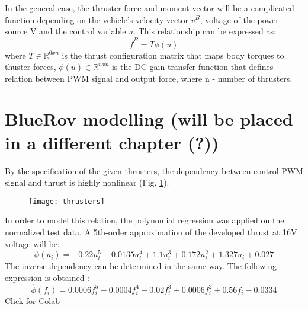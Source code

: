     In the general case, the thruster force and moment vector will be 
    a complicated function depending on the vehicle's velocity vector $\bar{v}^B$, 
    voltage of the power source V 
    and the control variable $u$.
    This relationship can be expressed as:
    $$
    \bar{f}^B=T\phi(u)
    $$
    where $T \in \mathbb{R}^{6 x n}$ is the thrust configuration matrix that maps body torques to thuster forces, 
    $\phi(u) \in \mathbb{R}^{n x n}$ is the DC-gain transfer function that defines relation between
    PWM signal and output force, where n - number of thrusters.

\section{BlueRov modelling (will be placed in a different chapter (?))}

    By the specification of the given thrusters, the dependency between control 
    PWM signal and thrust is highly nonlinear
    (Fig. \ref{image:thrust}).\\
    \begin{figure}[H]
        \centering\texttt{[image: thrusters]}
        \caption{}
        \label{image:thrust}
    \end{figure}
    In order to model this relation, the polynomial regression was applied on the normalized test data. 
    A 5th-order approximation of the developed thrust at 16V voltage will be:
    $$
    \phi(u_i) = - 0.22 u_i^5
    - 0.0135 u_i^4
    + 1.1 u_i^3
    + 0.172 u_i^2
    + 1.327 u_i 
    + 0.027
    $$
    The inverse dependency can be determined in the same way. 
    The following expression is obtained :
    $$
    \hat{\phi}(f_i) = 0.0006 f_i^5 
    - 0.0004 f_i^4 
    - 0.02 f_i^3
    + 0.0006 f_i^2 
    + 0.56 f_i
    -0.0334
    $$
    \href{https://colab.research.google.com/drive/1XaNNENZPk88yaddOYy01vXtHd8_YwT2m?usp=sharing}{Click for Colab}